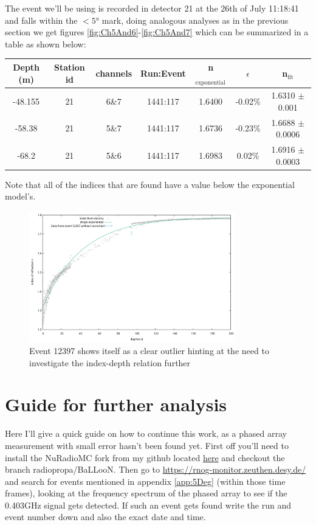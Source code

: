 The event we'll be using is recorded in detector 21 at the 26th of July
11:18:41 and falls within the $<5$° mark, doing analogous analyses as in the
previous section we get figures \ref{fig:Ch5And6}-\ref{fig:Ch5And7} which can
be summarized in a table as shown below:
\begin{center}
\begin{tabular}{||c c c c c c c||}
 \hline
 Depth (m) & Station id & channels & Run:Event & n$_\text{exponential}$ & $\epsilon$ & n$_\text{fit}$\\ [0.5ex]
 \hline\hline
 -48.155 & 21 & 6\&7 & 1441:117 & 1.6400 & -0.02\% & 1.6310 $\pm$ 0.001 \\
 -58.38 & 21 & 5\&7 & 1441:117 & 1.6736 & -0.23\% & 1.6688 $\pm$ 0.0006 \\
 -68.2 & 21 & 5\&6 & 1441:117 & 1.6983 & 0.02\% & 1.6916 $\pm$ 0.0003 \\
 \hline
\end{tabular}
\end{center}
Note that all of the indices that are found have a value below the
exponential model's.
\begin{figure}
	\centering
	\includegraphics[width=0.8\textwidth]{figures/Event12397NoCorr.pdf}
  \caption{Event 12397 shows itself as a clear outlier hinting at the need to investigate the index-depth relation further}
	\label{fig:IndexVSDepth.pdf}
\end{figure}
\section{Guide for further analysis}
Here I'll give a quick guide on how to continue this work, as a phased array
measurement with small error hasn't been found yet.  First off you'll need to
install the NuRadioMC fork from my github located
\href{https://github.com/arthuradriaens-code/NuRadioMC.git}{here} and checkout
the branch radiopropa/BaLLooN. Then go to
\url{https://rnog-monitor.zeuthen.desy.de/} and search for events mentioned in
appendix \ref{app:5Deg} (within those time frames), looking at the frequency
spectrum of the phased array to see if the 0.403GHz signal gets detected. If
such an event gets found write the run and event number down and also the exact
date and time.

